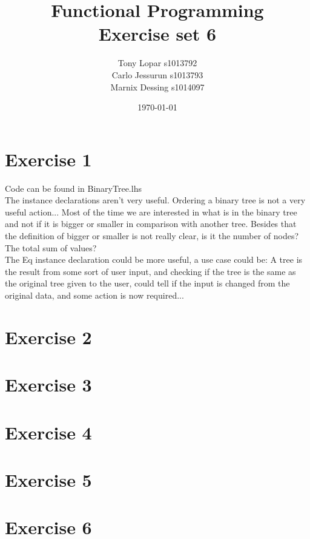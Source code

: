\documentclass{article}
\begin{document}
\title{Functional Programming \\ Exercise set 6}
\date{\today}
\author{Tony Lopar s1013792 \\ Carlo Jessurun s1013793 \\ Marnix Dessing s1014097}
\maketitle

\section*{Exercise 1}
Code can be found in BinaryTree.lhs\\
The instance declarations aren't very useful. Ordering a binary tree is not a very useful action... Most of the time we are interested in what is in the binary tree and not if it is bigger or smaller in comparison with another tree. Besides that the definition of bigger or smaller is not really clear, is it the number of nodes? The total sum of values?\\
The Eq instance declaration could be more useful, a use case could be: A tree is the result from some sort of user input, and checking if the tree is the same as the original tree given to the user, could tell if the input is changed from the original data, and some action is now required... 

\section*{Exercise 2}
\section*{Exercise 3}
\section*{Exercise 4}
\section*{Exercise 5}
\section*{Exercise 6}
\end{document}

